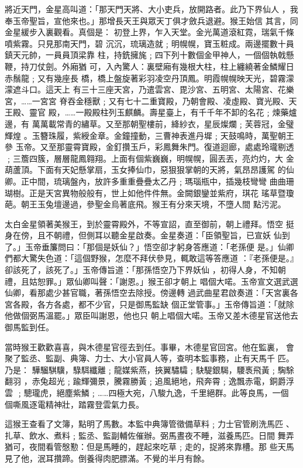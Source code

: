 \begin{pinyinscope}
{將近天門，金星高叫道：「那天門天將、大小吏兵，放開路者。此乃下界仙人
，我奉玉帝聖旨，宣他來也。」那增長天王與眾天丁俱才斂兵退避。猴王始信
其言，同金星緩步入裏觀看。真個是：
初登上界，乍入天堂。金光萬道滾紅霓，瑞氣千條噴紫霧。只見那南天門，碧
沉沉，琉璃造就﹔明幌幌，寶玉粧成。兩邊擺數十員鎮天元帥，一員員頂梁靠
柱，持銑擁旄﹔四下列十數個金甲神人，一個個執戟懸鞭，持刀仗劍。外廂猶
可，入內驚人：裏壁廂有幾根大柱，柱上纏繞著金鱗耀日赤鬚龍﹔又有幾座長
橋，橋上盤旋著彩羽凌空丹頂鳳。明霞幌幌映天光，碧霧濛濛遮斗口。這天上
有三十三座天宮，乃遣雲宮、毘沙宮、五明宮、太陽宮、花樂宮，……一宮宮
脊吞金穩獸﹔又有七十二重寶殿，乃朝會殿、凌虛殿、寶光殿、天王殿、靈官
殿，……一殿殿柱列玉麒麟。壽星臺上，有千千年不卸的名花﹔煉藥爐邊，有
萬萬載常青的繡草。又至那朝聖樓前，絳紗衣，星辰燦爛﹔芙蓉冠，金璧輝煌
。玉簪珠履，紫綬金章。金鐘撞動，三曹神表進丹墀﹔天鼓鳴時，萬聖朝王參
玉帝。又至那靈霄寶殿，金釘攢玉戶，彩鳳舞朱門。復道迴廊，處處玲瓏剔透
﹔三簷四簇，層層龍鳳翱翔。上面有個紫巍巍，明幌幌，圓丟丟，亮灼灼，大
金葫蘆頂。下面有天妃懸掌扇，玉女捧仙巾，惡狠狠掌朝的天將，氣昂昂護駕
的仙卿。正中間，琉璃盤內，放許多重重疊疊太乙丹﹔瑪瑙瓶中，插幾枝彎彎
曲曲珊瑚樹。正是天宮異物般般有，世上如他件件無。金闕銀鑾並紫府，琪花
瑤草暨瓊葩。朝王玉兔壇邊過，參聖金烏著底飛。猴王有分來天境，不墮人間
點污泥。

太白金星領著美猴王，到於靈霄殿外，不等宣詔，直至御前，朝上禮拜。悟空
挺身在傍，且不朝禮，但側耳以聽金星啟奏。金星奏道：「臣領聖旨，已宣妖
仙到了。」玉帝垂簾問曰：「那個是妖仙？」悟空卻才躬身答應道：「老孫便
是。」仙卿們都大驚失色道：「這個野猴，怎麼不拜伏參見，輒敢這等答應道
：『老孫便是。』卻該死了，該死了。」玉帝傳旨道：「那孫悟空乃下界妖仙
，初得人身，不知朝禮，且姑恕罪。」眾仙卿叫聲：「謝恩。」猴王卻才朝上
唱個大喏。玉帝宣文選武選仙卿，看那處少甚官職，著孫悟空去除授。傍邊轉
過武曲星君啟奏道：「天宮裏各宮各殿，各方各處，都不少官，只是御馬監缺
個正堂管事。」玉帝傳旨道：「就除他做個弼馬溫罷。」眾臣叫謝恩，他也只
朝上唱個大喏。玉帝又差木德星官送他去御馬監到任。

當時猴王歡歡喜喜，與木德星官徑去到任。事畢，木德星官回宮。他在監裏，
會聚了監丞、監副、典簿、力士、大小官員人等，查明本監事務，止有天馬千
匹。乃是：
驊騮騏驥，騄駬纖離﹔龍媒紫燕，挾翼驌驦﹔駃騠銀騔，騕褭飛黃﹔騊駼翻羽
，赤兔超光﹔踰輝彌景，騰霧勝黃﹔追風絕地，飛奔霄﹔逸飄赤電，銅爵浮雲
﹔驄瓏虎，絕塵紫鱗﹔……四極大宛，八駿九逸，千里絕群。此等良馬，一個
個嘶風逐電精神壯，踏霧登雲氣力長。

這猴王查看了文簿，點明了馬數。本監中典簿管徵備草料﹔力士官管刷洗馬匹
、扎草、飲水、煮料﹔監丞、監副輔佐催辦。弼馬晝夜不睡，滋養馬匹。日間
舞弄猶可，夜間看管慇懃：但是馬睡的，趕起來吃草﹔走的，捉將來靠槽。那
些天馬見了他，泯耳攢蹄。倒養得肉肥膘滿。不覺的半月有餘。

}
\end{pinyinscope}
